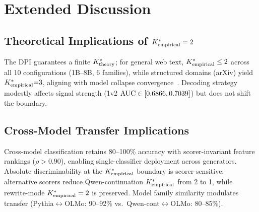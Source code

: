 \section{Extended Discussion}
\label{sec:extended_discussion}

\subsection{Theoretical Implications of ${K^*_{\text{empirical}}} = 2$}

The DPI guarantees a finite ${K^*_{\text{theory}}}$; for general web text, ${K^*_{\text{empirical}}} \leq 2$ across all 10 configurations (1B--8B, 6 families), while structured domains (arXiv) yield ${K^*_{\text{empirical}}}{=}3$, aligning with model collapse convergence~\cite{shumailov2024collapse, dohmatob2024model, alemohammad2024selfconsuming}.
Decoding strategy modestly affects signal strength (1v2 $\text{AUC} \in [0.6866, 0.7039]$) but does not shift the boundary.

\subsection{Cross-Model Transfer Implications}

Cross-model classification retains 80--100\% accuracy with scorer-invariant feature rankings ($\rho > 0.90$), enabling single-classifier deployment across generators.
Absolute discriminability at the ${K^*_{\text{empirical}}}$ boundary is scorer-sensitive: alternative scorers reduce Qwen-continuation ${K^*_{\text{empirical}}}$ from 2 to 1, while rewrite-mode ${K^*_{\text{empirical}}} = 2$ is preserved.
Model family similarity modulates transfer (Pythia$\leftrightarrow$OLMo: 90--92\% vs.\ Qwen-cont$\leftrightarrow$OLMo: 80--85\%).

\begin{minipage}{\columnwidth}
\centering
{}
\label{tab:crossscorer}
\resizebox{\columnwidth}{!}{}
\end{minipage}

